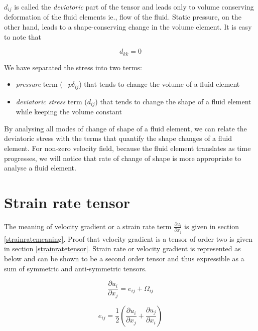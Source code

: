$d_{ij}$ is called the {\em deviatoric} part of the tensor and leads only to volume conserving deformation of the fluid elements ie., flow of the fluid. Static pressure, on the other hand, leads to a shape-conserving change in the volume element. It is easy to note that 

\begin{equation}
d_{kk} = 0
\end{equation} 

We have separated the stress into two terms:
\begin{itemize}
\item 
{\em pressure}  term ($-p\delta_{ij}$) that tends to change the volume of a fluid element 
\item 
{\em deviatoric stress} term ($d_{ij}$) that tends to change the shape of a fluid element while keeping the volume constant
\end{itemize}

By analysing all modes of change of shape of a fluid element, we can relate the deviatoric stress with the terms that quantify the shape changes of a fluid element. For non-zero velocity field, because the fluid element translates as time progresses, we will notice that rate of change of shape is more appropriate to analyse a fluid element.

\section{Strain rate tensor}


The meaning of velocity gradient or a strain rate term $\frac{\partial u_i}{\partial x_j}$ is given in section \ref{strainratemeaning}. Proof that velocity gradient is a tensor of order two is given in section \ref{strainratetensor}. Strain rate or velocity gradient is represented as below and can be shown to be a second order tensor and thus expressible as a sum of symmetric and anti-symmetric tensors. 

\begin{equation}
\frac{\partial u_i}{\partial x_j} = e_{ij} + \Omega_{ij} 
\end{equation} 

\begin{equation}
e_{ij} = \frac{1}{2} \left( \frac{\partial u_i}{\partial x_j} + \frac{\partial u_j}{\partial x_i} \right) 
\end{equation} 


